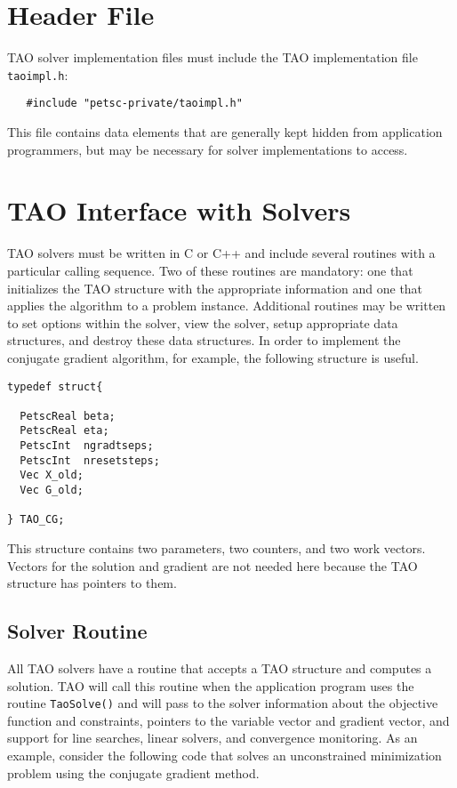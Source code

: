 \section{Header File}
TAO solver implementation files must include the TAO implementation file \texttt{taoimpl.h}:
\begin{verbatim}
   #include "petsc-private/taoimpl.h"
\end{verbatim}
This file contains data elements that are generally kept hidden from application
programmers, but may be necessary for solver implementations to access.
\noindent


\section{TAO Interface with Solvers}
TAO solvers must be written in C or C++ and include several routines with
a particular calling sequence.  Two of these routines are mandatory:
one that initializes the TAO structure with the appropriate information
and one that applies the algorithm to a problem instance.
Additional routines may be written to set options within the
solver, view the solver, setup appropriate data structures, and destroy
these data structures. In order to implement the conjugate
gradient algorithm, for example, the following structure is
useful.
\begin{verbatim}
typedef struct{

  PetscReal beta;
  PetscReal eta;
  PetscInt  ngradtseps;
  PetscInt  nresetsteps;
  Vec X_old;
  Vec G_old; 

} TAO_CG;
\end{verbatim}
This structure contains two parameters, two counters, and two work vectors.
Vectors
for the solution and gradient are not needed here because the TAO
structure has pointers to them.


\subsection{Solver Routine}
All TAO solvers have a routine that accepts a TAO structure and
computes a solution.  
TAO will call this routine when the application
program uses the routine {\tt TaoSolve()} and will pass to the solver
information
about the objective function and constraints, pointers to the
variable vector and gradient vector, and support for line searches,
linear solvers, and convergence monitoring.  As an example, consider
the following code that solves an unconstrained minimization problem
using the conjugate gradient method.

